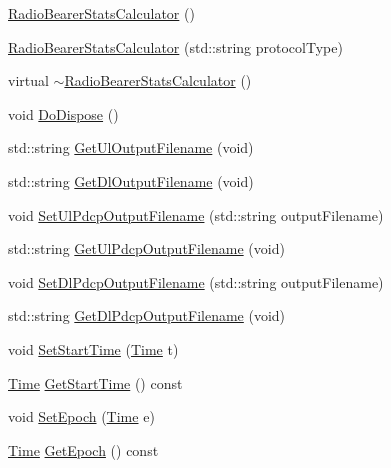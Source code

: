 \begin{DoxyCompactItemize}
\item 
\hyperlink{classns3_1_1RadioBearerStatsCalculator_a0942cbb6281ff7aca5af8e3de0a0b8ab}{Radio\+Bearer\+Stats\+Calculator} ()
\item 
\hyperlink{classns3_1_1RadioBearerStatsCalculator_a504f4c5c888324250bd4cc63993e36c7}{Radio\+Bearer\+Stats\+Calculator} (std\+::string protocol\+Type)
\item 
virtual \hyperlink{classns3_1_1RadioBearerStatsCalculator_aafa6e63cbe5556331d592c2c7ed6e915}{$\sim$\+Radio\+Bearer\+Stats\+Calculator} ()
\item 
void \hyperlink{classns3_1_1RadioBearerStatsCalculator_a2640e8d96236a185e669ac795bc2c132}{Do\+Dispose} ()
\item 
std\+::string \hyperlink{classns3_1_1RadioBearerStatsCalculator_aec09f2c71919455f50e775954d0976b3}{Get\+Ul\+Output\+Filename} (void)
\item 
std\+::string \hyperlink{classns3_1_1RadioBearerStatsCalculator_a9260f28ff1641f347b8dcabed66160f3}{Get\+Dl\+Output\+Filename} (void)
\item 
void \hyperlink{classns3_1_1RadioBearerStatsCalculator_abef1b82cecac16f8b007850dfafb6779}{Set\+Ul\+Pdcp\+Output\+Filename} (std\+::string output\+Filename)
\item 
std\+::string \hyperlink{classns3_1_1RadioBearerStatsCalculator_a4562ed1af998e67d0014aed07da627b0}{Get\+Ul\+Pdcp\+Output\+Filename} (void)
\item 
void \hyperlink{classns3_1_1RadioBearerStatsCalculator_afe99a0d767cc85a522263de4332090a3}{Set\+Dl\+Pdcp\+Output\+Filename} (std\+::string output\+Filename)
\item 
std\+::string \hyperlink{classns3_1_1RadioBearerStatsCalculator_a04dcbc91cc17df518ca23bcc1483971c}{Get\+Dl\+Pdcp\+Output\+Filename} (void)
\item 
void \hyperlink{classns3_1_1RadioBearerStatsCalculator_aa2eddec79377156e7653f9d5be97d10e}{Set\+Start\+Time} (\hyperlink{classns3_1_1Time}{Time} t)
\item 
\hyperlink{classns3_1_1Time}{Time} \hyperlink{classns3_1_1RadioBearerStatsCalculator_a9d9957895037d6a4af2f1d28c354bc46}{Get\+Start\+Time} () const 
\item 
void \hyperlink{classns3_1_1RadioBearerStatsCalculator_afe72ec59fb25163dad6c3b47abcb0a32}{Set\+Epoch} (\hyperlink{classns3_1_1Time}{Time} e)
\item 
\hyperlink{classns3_1_1Time}{Time} \hyperlink{classns3_1_1RadioBearerStatsCalculator_a503dff119965e0b1555bad3bb47fbad2}{Get\+Epoch} () const 

\end{DoxyCompactItemize}
